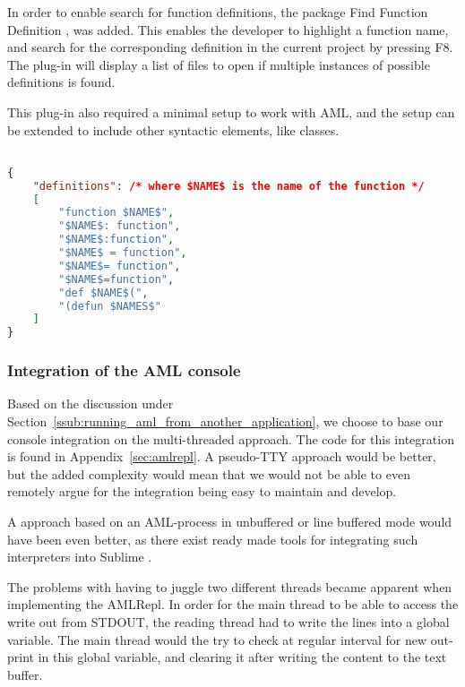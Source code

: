 In order to enable search for function definitions, the package Find Function Definition \citep{Douglas}, was added. This enables the developer to highlight a function name, and search for the corresponding definition in the current project by pressing F8. The plug-in will display a list of files to open if multiple instances of possible definitions is found.

This plug-in also required a minimal setup to work with AML, and the setup can be extended to include other syntactic elements, like classes.

\begin{lstlisting}[language=json,caption={Find Function Definition Config},label={lst:findFuctionDefinitionConfig}]

{
    "definitions": /* where $NAME$ is the name of the function */
    [
        "function $NAME$",
        "$NAME$: function",
        "$NAME$:function",
        "$NAME$ = function",
        "$NAME$= function",
        "$NAME$=function",
        "def $NAME$(",
        "(defun $NAMES$"
    ]
}
\end{lstlisting}


\subsubsection{Integration of the AML console} %
\label{ssub:integration_of_the_aml_console}
Based on the discussion under Section~\ref{ssub:running_aml_from_another_application}, we choose to base our console integration on the multi-threaded approach. The code for this integration is found in Appendix~\ref{sec:amlrepl}. A pseudo-TTY approach would be better, but the added complexity would mean that we would not be able to even remotely argue for the integration being easy to maintain and develop.

A approach based on an AML-process in unbuffered or line buffered mode would have been even better, as there exist ready made tools for integrating such interpreters into Sublime \cite{bederski}.

The problems with having to juggle two different threads became apparent when implementing the AMLRepl. In order for the main thread to be able to access the write out from STDOUT, the reading thread had to write the lines into a global variable. The main thread would the try to check at regular interval for new out-print in this global variable, and clearing it after writing the content to the text buffer.

